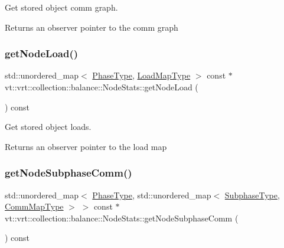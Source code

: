 Get stored object comm graph. 

\begin{DoxyReturn}{Returns}
an observer pointer to the comm graph 
\end{DoxyReturn}
\mbox{\label{structvt_1_1vrt_1_1collection_1_1balance_1_1_node_stats_a5b34d26f9e10f7ff3ceb92b95f0ed2f6}} 
\subsubsection{\texorpdfstring{get\+Node\+Load()}{getNodeLoad()}}
{\footnotesize\ttfamily std\+::unordered\+\_\+map$<$ \hyperlink{namespacevt_a46ce6733d5cdbd735d561b7b4029f6d7}{Phase\+Type}, \hyperlink{namespacevt_1_1vrt_1_1collection_1_1balance_a45306ee4bf38fe3fb586d1ee2fa3d147}{Load\+Map\+Type} $>$ const  $\ast$ vt\+::vrt\+::collection\+::balance\+::\+Node\+Stats\+::get\+Node\+Load (\begin{DoxyParamCaption}{ }\end{DoxyParamCaption}) const}



Get stored object loads. 

\begin{DoxyReturn}{Returns}
an observer pointer to the load map 
\end{DoxyReturn}
\mbox{\label{structvt_1_1vrt_1_1collection_1_1balance_1_1_node_stats_ae44b616cad5c50a36faeb2cc78457a52}} 
\subsubsection{\texorpdfstring{get\+Node\+Subphase\+Comm()}{getNodeSubphaseComm()}}
{\footnotesize\ttfamily std\+::unordered\+\_\+map$<$ \hyperlink{namespacevt_a46ce6733d5cdbd735d561b7b4029f6d7}{Phase\+Type}, std\+::unordered\+\_\+map$<$ \hyperlink{namespacevt_ae78cbfdf1e57470e33eedb074f2beeba}{Subphase\+Type}, \hyperlink{namespacevt_1_1vrt_1_1collection_1_1balance_a10860c956804d644db54a16012352728}{Comm\+Map\+Type} $>$ $>$ const  $\ast$ vt\+::vrt\+::collection\+::balance\+::\+Node\+Stats\+::get\+Node\+Subphase\+Comm (\begin{DoxyParamCaption}{ }\end{DoxyParamCaption}) const}



